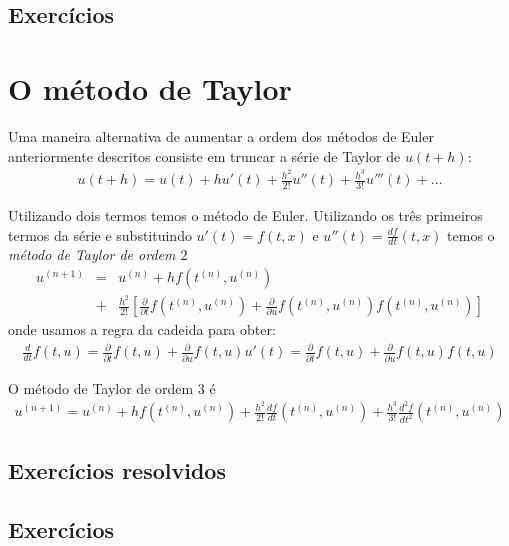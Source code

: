 \subsection*{Exercícios}

\construirExer

\section{O método de Taylor}
Uma maneira alternativa de aumentar a ordem dos métodos de Euler anteriormente descritos consiste em truncar a série de Taylor de $u(t+h)$:
\begin{eqnarray}
 u(t+h)=u(t) +h u'(t)+ \frac{h^2}{2!}u''(t)+\frac{h^3}{3!}u'''(t)+\ldots
\end{eqnarray}

Utilizando dois termos temos o método de Euler. Utilizando os três primeiros termos da série e substituindo $u'(t)=f(t,x)$ e $u''(t)=\frac{d f}{d t}(t,x)$ temos o \emph{método de Taylor de ordem $2$}
\begin{eqnarray}
   u^{(n+1)}&=&u^{(n)} +h f(t^{(n)},u^{(n)})\\&+& \frac{h^2}{2!} \left[ \frac{\partial}{\partial t}f(t^{(n)},u^{(n)})+\frac{\partial}{\partial u}f(t^{(n)},u^{(n)})f(t^{(n)},u^{(n)})\right]
\end{eqnarray}
onde usamos a regra da cadeida para obter:
\begin{eqnarray}
  \frac{d }{d t}f(t,u)= \frac{\partial}{\partial t}f(t,u)+\frac{\partial}{\partial u}f(t,u)u'(t)=\frac{\partial}{\partial t}f(t,u)+\frac{\partial}{\partial u}f(t,u)f(t,u)
\end{eqnarray}



O método de Taylor de ordem $3$ é
\begin{eqnarray}
   u^{(n+1)}=u^{(n)} +h f(t^{(n)},u^{(n)})+ \frac{h^2}{2!}\frac{d f}{d t}(t^{(n)},u^{(n)})+\frac{h^3}{3!}\frac{d^2 f}{d t^2}(t^{(n)},u^{(n)})
\end{eqnarray}

\subsection*{Exercícios resolvidos}

\construirExeresol

\subsection*{Exercícios}

